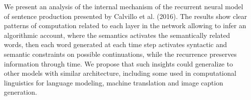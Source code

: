 We present an analysis of the internal mechanism of the recurrent neural model of sentence production presented by Calvillo et al. (2016). The results show clear patterns of computation related to each layer in the network allowing to infer an algorithmic account, where the semantics activates the semantically related words, then each word generated at each time step activates syntactic and semantic constraints on possible continuations, while the recurrence preserves information through time. We propose that such insights could generalize to other models with similar architecture, including some used in computational linguistics for language modeling, machine translation and image caption generation.
